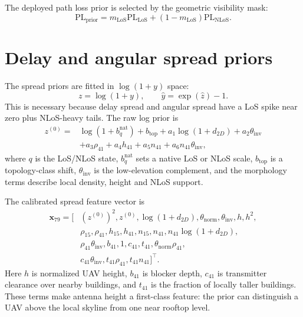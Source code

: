The deployed path loss prior is selected by the geometric visibility mask:
\begin{equation}
\mathrm{PL}_{\mathrm{prior}}
=m_{\mathrm{LoS}}\mathrm{PL}_{\mathrm{LoS}}
+(1-m_{\mathrm{LoS}})\mathrm{PL}_{\mathrm{NLoS}}.
\label{eq:pl_hybrid}
\end{equation}

\section{Delay and angular spread priors}
\label{sec:try79_detail}

The spread priors are fitted in
\(\log(1+y)\) space:
\begin{equation}
z=\log(1+y),
\qquad
\hat y=\exp(\hat z)-1.
\label{eq:log_transform_79}
\end{equation}
This is necessary because delay spread and angular spread have a LoS spike near
zero plus NLoS-heavy tails. The raw log prior is
\begin{equation}
\begin{aligned}
z^{(0)}
={}&\log(1+b^{\mathrm{nat}}_q)
+b_{\mathrm{top}}
+a_1\log(1+d_{2D})+a_2\theta_{\mathrm{inv}}\\
&+a_3\rho_{41}+a_4h_{41}+a_5n_{41}
+a_6n_{41}\theta_{\mathrm{inv}},
\end{aligned}
\label{eq:raw_spread}
\end{equation}
where \(q\) is the LoS/NLoS state, \(b^{\mathrm{nat}}_q\) sets a native LoS or
NLoS scale, \(b_{\mathrm{top}}\) is a topology-class shift,
\(\theta_{\mathrm{inv}}\) is the low-elevation complement, and the morphology
terms describe local density, height and NLoS support.

The calibrated spread feature vector is
\begin{equation}
\begin{aligned}
\mathbf{x}_{79}=[&
(z^{(0)})^2,z^{(0)},\log(1+d_{2D}),\theta_{\mathrm{norm}},
\theta_{\mathrm{inv}},h,h^2,\\
&\rho_{15},\rho_{41},h_{15},h_{41},n_{15},n_{41},
n_{41}\log(1+d_{2D}),\\
&\rho_{41}\theta_{\mathrm{inv}},b_{41},1,c_{41},t_{41},
\theta_{\mathrm{norm}}\rho_{41},\\
&c_{41}\theta_{\mathrm{inv}},t_{41}\rho_{41},t_{41}n_{41}]^{\top}.
\end{aligned}
\label{eq:x79}
\end{equation}
Here \(h\) is normalized UAV height, \(b_{41}\) is blocker depth,
\(c_{41}\) is transmitter clearance over nearby buildings, and \(t_{41}\) is
the fraction of locally taller buildings. These terms make antenna height a
first-class feature: the prior can distinguish a UAV above the local skyline
from one near rooftop level.

